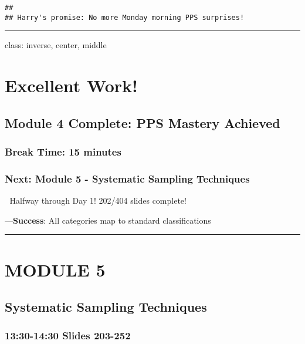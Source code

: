 \documentclass[
]{article}
\begin{document}
\begin{verbatim}
## 
## Harry's promise: No more Monday morning PPS surprises!
\end{verbatim}

\begin{center}\rule{0.5\linewidth}{0.5pt}\end{center}

class: inverse, center, middle

\section{Excellent Work!}\label{excellent-work}

\subsection{Module 4 Complete: PPS Mastery
Achieved}\label{module-4-complete-pps-mastery-achieved}

\subsubsection{Break Time: 15 minutes}\label{break-time-15-minutes-1}

\subsubsection{Next: Module 5 - Systematic Sampling
Techniques}\label{next-module-5---systematic-sampling-techniques}

🎯 Halfway through Day 1! 202/404 slides complete!

---\textbf{Success}: All categories map to standard classifications

\begin{center}\rule{0.5\linewidth}{0.5pt}\end{center}

\section{MODULE 5}\label{module-5}

\subsection{Systematic Sampling
Techniques}\label{systematic-sampling-techniques}

\subsubsection{13:30-14:30 \textbar{} Slides
203-252}\label{slides-203-252}
\end{document}
